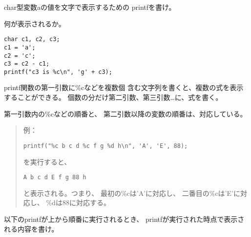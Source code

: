 \documentclass[12pt,a4j]{jarticle}
\newcounter{toi}
\def\toi{%
\bigskip\bigskip\noindent
\addtocounter{toi}{1}
\shadowbox{\bfseries\large 問\thetoi}
\nopagebreak[4]\bigskip\nopagebreak[4]
}
\begin{document}


\toi

char型変数{\ttfamily a}の値を文字で表示するための
{\ttfamily printf}を書け。



\toi

何が表示されるか。
\begin{verbatim}
char c1, c2, c3;
c1 = 'a';
c2 = 'c';
c3 = c2 - c1;
printf("c3 is %c\n", 'g' + c3);
\end{verbatim}





\toi


{\ttfamily printf}関数の第一引数に{\ttfamily \%c}などを複数個
含む文字列を書くと、複数の式を表示することができる。
個数の分だけ第二引数、第三引数…に、式を書く。

第一引数内の{\ttfamily \%c}などの順番と、
第二引数以降の変数の順番は、対応している。

\begin{quote}
例：

\verb+printf("%c b c d %c f g %d h\n", 'A', 'E', 88);+

を実行すると、

\verb+A b c d E f g 88 h+

と表示される。つまり、
{\ttfamily 最初の\%cは'A'に対応し、
二番目の\%cは'E'に対応し、
\%dは88に対応する。}

\end{quote}


以下の{\ttfamily printf}が上から順番に実行されるとき、
{\ttfamily printf}が実行された時点で表示される内容を書け。
\begin{center}
\end{center}
\end{document}
